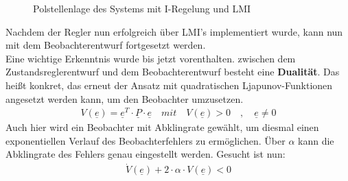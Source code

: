 \begin{figure}[H]
    \centering
    \caption[Polstellen Regler mit LMI]{Polstellenlage des Systems mit I-Regelung und LMI}
    \label{fig:Bild45}
\end{figure}

Nachdem der Regler nun erfolgreich über LMI's implementiert wurde, kann nun mit dem Beobachterentwurf fortgesetzt werden.\\
Eine wichtige Erkenntnis wurde bis jetzt vorenthalten. zwischen dem Zustandsreglerentwurf und dem Beobachterentwurf besteht eine \textbf{Dualität}. Das heißt konkret, das erneut der Ansatz mit quadratischen Ljapunov-Funktionen angesetzt werden kann, um den Beobachter umzusetzen.
\begin{align}
    V(\underline{e}) = \underline{e}^T \cdot \underline{P} \cdot \underline{e} \quad mit \quad V(\underline{e}) > 0 \quad , \quad \underline{e} \neq 0 
\end{align}
\newline
Auch hier wird ein Beobachter mit Abklingrate gewählt, um diesmal einen exponentiellen Verlauf des Beobachterfehlers zu ermöglichen. Über $\alpha$ kann die Abklingrate des Fehlers genau eingestellt werden. Gesucht ist nun:
\begin{align}
    \dot{V}(\underline{e}) + 2 \cdot \alpha \cdot V(\underline{e}) < 0
\end{align}

